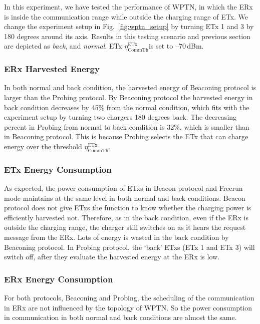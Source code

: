 \documentclass[11pt,draftclsnofoot,journal,onecolumn]{IEEEtran}
\newcommand{\txRssiThreshold}{$\eta^\text{ETx}_\text{CommTh}$}
\begin{document}
In this experiment, we have tested the performance of WPTN, in which the ERx is inside the communication range while outside the charging range of ETx. We change the experiment setup in Fig.~\ref{fig:wptn_setup} by turning ETx 1 and 3 by 180 degrees around its axis. Results in this testing scenario and previous section are depicted as \textit{back}, and \textit{normal}. ETx \txRssiThreshold is set to --70\,dBm.

\subsubsection{ERx Harvested Energy}
\label{sec:harvested_energy_nlos}

In both normal and back condition, the harvested energy of Beaconing protocol is larger than the Probing protocol. By Beaconing protocol the harvested energy in back condition decreases by 45\% from the normal condition, which fits with the experiment setup by turning two chargers 180 degrees back. The decreasing percent in Probing from normal to back condition is 32\%, which is smaller than in Beaconing protocol. This is because Probing selects the ETx that can charge energy over the threshold \txRssiThreshold.

\subsubsection{ETx Energy Consumption}
\label{sec:etx_energy_consumption}

As expected, the power consumption of ETxs in Beacon protocol and Freerun mode maintains at the same level in both normal and back conditions. Beacon protocol does not give ETxs the function to know whether the charging power is efficiently harvested not. Therefore, as in the back condition, even if the ERx is outside the charging range, the charger still switches on as it hears the request message from the ERx. Lots of energy is wasted in the back condition by Beaconing protocol. In Probing protocol, the `back' ETxs (ETx 1 and ETx 3) will switch off, after they evaluate the harvested energy at the ERx is low.

\subsubsection{ERx Energy Consumption}
\label{sec:power_consumption_nlos}

For both protocols, Beaconing and Probing, the scheduling of the communication in ERx are not influenced by the topology of WPTN. So the power consumption in communication in both normal and back conditions are almost the same.
\end{document}
